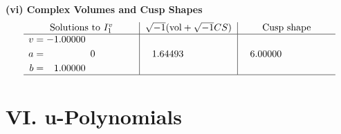 \documentclass[1p]{elsarticle_modified}
\theoremstyle{definition}
\newcommand{\I}{\sqrt{-1}}
\begin{document}
\newpage\flushleft \textbf{(vi) Complex Volumes and Cusp Shapes}
$$\begin{array}{c|c|c}  
\text{Solutions to }I^v_{1}& \I (\text{vol} + \sqrt{-1}CS) & \text{Cusp shape}\\
 \hline 
\begin{aligned}
v &= -1.00000\phantom{ +0.000000I} \\
a &= \phantom{-0.000000 } 0 \\
b &= \phantom{-}1.00000\phantom{ +0.000000I}\end{aligned}
 & \phantom{-}1.64493\phantom{ +0.000000I} & \phantom{-}6.00000\phantom{ +0.000000I}\\
 \hline 
 \end{array}$$\newpage
\newpage\renewcommand{\arraystretch}{1}
\centering \section*{ VI. u-Polynomials}
\end{document}
